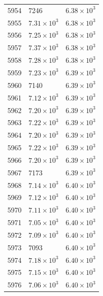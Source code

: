\begin{table}[H]
\begin{tabular}{lll}
5954 & 7246 & $\displaystyle 6.38 \times 10^{3}$ \\
5955 & $\displaystyle 7.31 \times 10^{3}$ & $\displaystyle 6.38 \times 10^{3}$ \\
5956 & $\displaystyle 7.25 \times 10^{3}$ & $\displaystyle 6.38 \times 10^{3}$ \\
5957 & $\displaystyle 7.37 \times 10^{3}$ & $\displaystyle 6.38 \times 10^{3}$ \\
5958 & $\displaystyle 7.28 \times 10^{3}$ & $\displaystyle 6.38 \times 10^{3}$ \\
5959 & $\displaystyle 7.23 \times 10^{3}$ & $\displaystyle 6.39 \times 10^{3}$ \\
5960 & 7140 & $\displaystyle 6.39 \times 10^{3}$ \\
5961 & $\displaystyle 7.12 \times 10^{3}$ & $\displaystyle 6.39 \times 10^{3}$ \\
5962 & $\displaystyle 7.20 \times 10^{3}$ & $\displaystyle 6.39 \times 10^{3}$ \\
5963 & $\displaystyle 7.22 \times 10^{3}$ & $\displaystyle 6.39 \times 10^{3}$ \\
5964 & $\displaystyle 7.20 \times 10^{3}$ & $\displaystyle 6.39 \times 10^{3}$ \\
5965 & $\displaystyle 7.22 \times 10^{3}$ & $\displaystyle 6.39 \times 10^{3}$ \\
5966 & $\displaystyle 7.20 \times 10^{3}$ & $\displaystyle 6.39 \times 10^{3}$ \\
5967 & 7173 & $\displaystyle 6.39 \times 10^{3}$ \\
5968 & $\displaystyle 7.14 \times 10^{3}$ & $\displaystyle 6.40 \times 10^{3}$ \\
5969 & $\displaystyle 7.12 \times 10^{3}$ & $\displaystyle 6.40 \times 10^{3}$ \\
5970 & $\displaystyle 7.11 \times 10^{3}$ & $\displaystyle 6.40 \times 10^{3}$ \\
5971 & $\displaystyle 7.05 \times 10^{3}$ & $\displaystyle 6.40 \times 10^{3}$ \\
5972 & $\displaystyle 7.09 \times 10^{3}$ & $\displaystyle 6.40 \times 10^{3}$ \\
5973 & 7093 & $\displaystyle 6.40 \times 10^{3}$ \\
5974 & $\displaystyle 7.18 \times 10^{3}$ & $\displaystyle 6.40 \times 10^{3}$ \\
5975 & $\displaystyle 7.15 \times 10^{3}$ & $\displaystyle 6.40 \times 10^{3}$ \\
5976 & $\displaystyle 7.06 \times 10^{3}$ & $\displaystyle 6.40 \times 10^{3}$ \\

\end{tabular}
\end{table}
